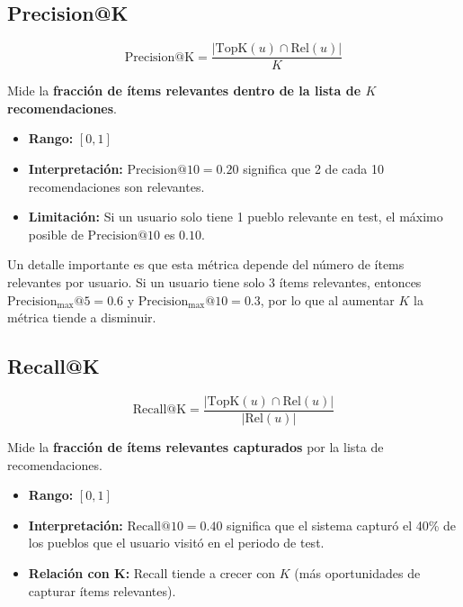 \documentclass[11pt, a4paper]{article}
\begin{document}
\subsection{Precision@K}

\begin{equation}
    \text{Precision@K} = \frac{|\text{TopK}(u) \cap \text{Rel}(u)|}{K}
\end{equation}

Mide la \textbf{fracción de ítems relevantes dentro de la lista de $K$ recomendaciones}.

\begin{itemize}
    \item \textbf{Rango:} $[0, 1]$
    \item \textbf{Interpretación:} $\text{Precision@10} = 0.20$ significa que 2 de cada 10 recomendaciones son relevantes.
    \item \textbf{Limitación:} Si un usuario solo tiene 1 pueblo relevante en test, el máximo posible de $\text{Precision@10}$ es $0.10$.
\end{itemize}

Un detalle importante es que esta métrica depende del número de ítems relevantes por usuario. Si un usuario tiene solo 3 ítems relevantes, entonces $\text{Precision}_{\max}\text{@5} = 0.6$ y $\text{Precision}_{\max}\text{@10} = 0.3$, por lo que al aumentar $K$ la métrica tiende a disminuir.

\subsection{Recall@K}

\begin{equation}
    \text{Recall@K} = \frac{|\text{TopK}(u) \cap \text{Rel}(u)|}{|\text{Rel}(u)|}
\end{equation}

Mide la \textbf{fracción de ítems relevantes capturados} por la lista de recomendaciones.

\begin{itemize}
    \item \textbf{Rango:} $[0, 1]$
    \item \textbf{Interpretación:} $\text{Recall@10} = 0.40$ significa que el sistema capturó el 40\% de los pueblos que el usuario visitó en el periodo de test.
    \item \textbf{Relación con K:} Recall tiende a crecer con $K$ (más oportunidades de capturar ítems relevantes).
\end{itemize}
\end{document}
